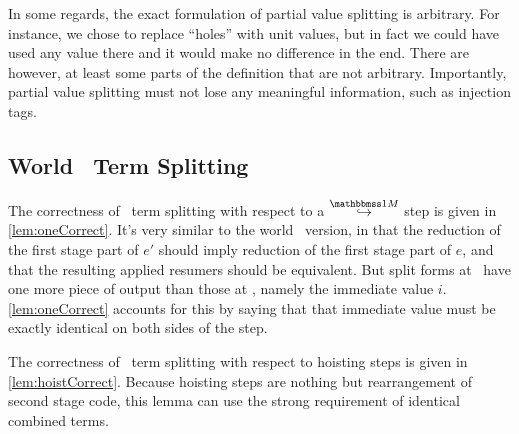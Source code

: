 \begin{abstrsyn}
In some regards, the exact formulation of partial value splitting is arbitrary.
For instance, we chose to replace ``holes'' with unit values,
but in fact we could have used any value there and it would make no difference in the end.
There are however, at least some parts of the definition that are not arbitrary.
Importantly, partial value splitting must not lose any meaningful information,
such as injection tags.





\subsection{World \bbonem\ Term Splitting}

The correctness of \bbonem\ term splitting with respect to a $\stepsym \bbonem$ step is given in \ref{lem:oneCorrect}.
It's very similar to the world \bbtwo\ version, 
in that the reduction of the first stage part of $e'$ should imply reduction of the first stage part of $e$,
and that the resulting applied resumers should be equivalent.
But split forms at \bbonem\ have one more piece of output than those at \bbtwo,
namely the immediate value $i$.
\ref{lem:oneCorrect} accounts for this by saying that 
that immediate value must be exactly identical on both sides of the step.

The correctness of \bbonem\ term splitting with respect to hoisting steps is given in \ref{lem:hoistCorrect}.
Because hoisting steps are nothing but rearrangement of second stage code,
this lemma can use the strong requirement of identical combined terms.


\end{abstrsyn}
